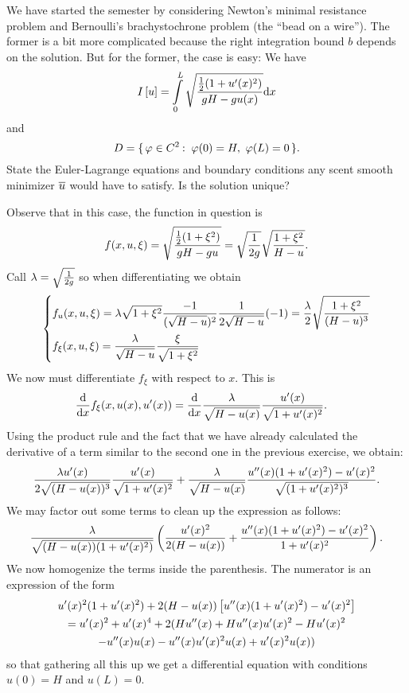 \documentclass[12pt]{memoir}
\begin{document}
\begin{Ej}
    We have started the semester by considering Newton's
    minimal resistance problem and Bernoulli's brachystochrone problem (the ``bead on a wire''). The former is
    a bit more complicated because the right integration bound $ b$ depends on the solution. But for the former,
    the case is easy: We have
    $$I\bonj{u}=\int\limits_0^L\sqrt{\frac{\half(1+u'(x)^2)}{gH-gu(x)}}\dd x$$
    and
    $$D=\set{\vf\in C^2\:\ \vf(0)=H,\ \vf(L)=0}.$$
    State the Euler-Lagrange equations and boundary conditions any scent smooth minimizer $\overline u$ would
have to satisfy. Is the solution unique?
\end{Ej}

\begin{ptcbr}
Observe that in this case, the function in question is 
$$f(x,u,\xi)=\sqrt{\frac{\half(1+\xi^2)}{gH-gu}}=\sqrt{\frac{1}{2g}}\sqrt{\frac{1+\xi^2}{H-u}}.$$
Call $\lambda=\sqrt{\frac{1}{2g}}$ so when differentiating we obtain 
$$\left\lbrace
\begin{aligned}
    &f_u(x,u,\xi)=\lambda\sqrt{1+\xi^2}\frac{-1}{(\sqrt{H-u})^2}\frac{1}{2\sqrt{H-u}}(-1)=\frac{\lambda}{2}\sqrt{\frac{1+\xi^2}{(H-u)^3}}\\
    &f_\xi(x,u,\xi)=\frac{\lambda}{\sqrt{H-u}}\frac{\xi}{\sqrt{1+\xi^2}}
\end{aligned}
\right.
$$
We now must differentiate $f_\xi$ with respect to $x$. This is 
\begin{align*}
    \dv{x}f_{\xi}(x,u(x),u'(x))&=\dv{x}\frac{\lambda}{\sqrt{H-u(x)}}\frac{u'(x)}{\sqrt{1+u'(x)^2}}.
\end{align*}
Using the product rule and the fact that we have already calculated the derivative of a term similar to the second one in the previous exercise, we obtain:
$$\frac{\lambda u'(x)}{2\sqrt{(H-u(x))^3}}\frac{u'(x)}{\sqrt{1+u'(x)^2}}+\frac{\lambda}{\sqrt{H-u(x)}}\frac{u''(x)(1+u'(x)^2)-u'(x)^2}{\sqrt{(1+u'(x)^2)^3}}.$$
We may factor out some terms to clean up the expression as follows:
$$\frac{\lambda}{\sqrt{(H-u(x))(1+u'(x)^2)}}\left(\frac{u'(x)^2}{2(H-u(x))}+\frac{u''(x)(1+u'(x)^2)-u'(x)^2}{1+u'(x)^2}\right).$$
We now homogenize the terms inside the parenthesis. The numerator is an expression of the form 
\begin{gather*}
u'(x)^2(1+u'(x)^2)+2(H-u(x))\left\lbrack u''(x)(1+u'(x)^2)-u'(x)^2\right\rbrack\\
=u'(x)^2+u'(x)^4+2(Hu''(x)+Hu''(x)u'(x)^2-Hu'(x)^2\\
-u''(x)u(x)-u''(x)u'(x)^2u(x)+u'(x)^2u(x))
\end{gather*}
so that gathering all this up we get a differential equation with conditions $u(0)=H$ and $u(L)=0$. 
\end{ptcbr}
\end{document}
